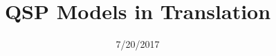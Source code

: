 \title{QSP Models in Translation} 
\date{7/20/2017} 

\newcommand{\stcolums}{\begin{columns}}
\newcommand{\fincolums}{\end{columns}}
\newcommand{\stcolum}{\begin{column}}
\newcommand{\fincolum}{\end{column}}
\newcommand{\stblock}{\begin{block}}
\newcommand{\finblock}{\end{block}}
\newcommand{\red}[1]{\textcolor{myred}{\tt #1}}
\newcommand{\redtt}[1]{\textcolor{myred}{\texttt{\textbf{#1}}}}
\newcommand{\redb}[1]{\red{{\bf #1}}}
\newcommand{\grb}[1]{\textcolor{mrggreen}{\bf #1}}
\newcommand{\ttg}[1]{\textcolor{mrggreen}{\bf \tt #1}}
\newcommand{\ttgb}[1]{\textcolor{mrggreen}{\texttt{\textbf{#1}}}}
\newcommand{\mrgsolve}{\ttg{mrgsolve}}
\newcommand{\ttdsb}[1]{\textcolor{darkslateblue}{\texttt{\textbf{#1}}}}
\newcommand{\dsbb}[1]{\textcolor{darkslateblue}{\textbf{#1}}}
\newcommand{\blkb}[1]{\textcolor{black}{\textbf{#1}}}



\newcommand{\mytitle}{
\vskip 0.5cm
\centerline{\texttt{[image: content/img/Metrum\_SystemsPharmacology]}}
}

\newcommand{\titlewhere}{
 \centerline{\textcolor{mrggreen2}{Cambridge Innovation Center}}
 \centerline{20 July 2017}
}


